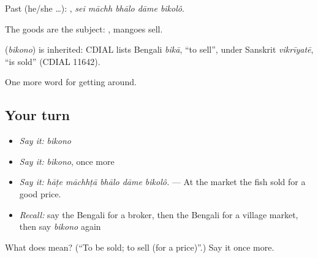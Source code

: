 Past (he/she …):     , \emph{sei māchh bhālo dāme bikolô}.

The goods are the subject:  , mangoes sell.

\begin{cousinweb}
\textbf{} (\emph{bikono}) is inherited: CDIAL lists Bengali \emph{bikā}, \textquotedblleft{}to sell\textquotedblright{}, under Sanskrit \emph{vikrīyatē}, \textquotedblleft{}is sold\textquotedblright{} (CDIAL 11642).
\end{cousinweb}

\begin{grammarlens}[title={What you've built}]
One more word for getting around.
\end{grammarlens}

\subsection*{Your turn}
\begin{itemize}
\raggedright
  \item \emph{Say it:} \emph{bikono}
  \item \emph{Say it:} \emph{bikono}, once more
  \item \emph{Say it:} \emph{hāṭe māchhṭā bhālo dāme bikolô.} — At the market the fish sold for a good price.
  \item \emph{Recall:} say the Bengali for a broker, then the Bengali for a village market, then say \emph{bikono} again
\end{itemize}

\begin{tcolorbox}[breakable,colback=teal!4,colframe=teal!35!black,title={Before you move on}]
What does  mean? (\textquotedblleft{}To be sold; to sell (for a price)\textquotedblright{}.) Say it once more.
\end{tcolorbox}
